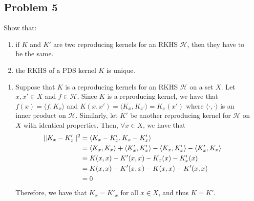 \documentclass[12pt]{article}
\begin{document}
\subsection*{Problem 5} %
\begin{mdframed}
    Show that:
    \begin{enumerate}[topsep=0pt, partopsep=0pt, itemsep=0pt, label=(\roman*)]
        \item if $K$ and $K'$ are two reproducing kernels for an RKHS $\mathcal{H}$, 
            then they have to be the same. \\
        \item the RKHS of a PDS kernel $K$ is unique.
    \end{enumerate}
\end{mdframed}

\begin{enumerate}[topsep=0pt, partopsep=0pt, itemsep=0pt, label=(\roman*)]
    \item Suppose that $K$ is a reproducing kernels for an RKHS $\mathcal{H}$ on a set $X$. 
        Let $x,x'\in X$ and $f\in \mathcal{H}$. Since $K$ is a reproducing kernel, we have that 
        $f(x)=\langle f, K_x\rangle$ and $K(x,x') = \langle K_x, K_{x'}\rangle = K_x(x')$ where 
        $\langle \cdot,\cdot\rangle$ is an inner product on $\mathcal{H}$. 
        Similarly, let $K'$ be another reproducing kernel for $\mathcal{H}$ on $X$ with identical 
        properties. Then, $\forall x \in X$, we have that
        \begin{align*}
            \|K_x - K'_x\|^2 &= \langle K_x - K'_x,K_x - K'_x\rangle \\
            &= \langle K_x,K_x\rangle+\langle K'_x,K'_x\rangle-\langle K_x,K'_x\rangle-\langle K'_x,K_x\rangle \\ 
            &= K(x,x)+K'(x,x)-K_x(x)-K'_x(x) \\
            &= K(x,x)+K'(x,x)-K(x,x)-K'(x,x) \\
            &=0
        \end{align*}
        Therefore, we have that $K_x = K'_x$ for all $x \in X$, and thus $K=K'$.


\end{enumerate}
\end{document}

